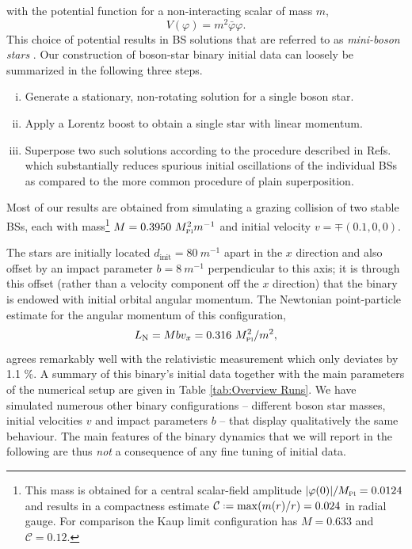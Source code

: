 \documentclass[aps,twocolumn,nofootinbib,superscriptaddress,amsfonts,floatfix
]{revtex4-1} %
\newcommand{\mpl}{M_{\mbox{\tiny Pl}}}
\newcommand*{\defeq}{\mathrel{\vcenter{\baselineskip0.5ex \lineskiplimit0pt
                     \hbox{\scriptsize.}\hbox{\scriptsize.}}}%
                     =}
\begin{document}
with the potential function for a non-interacting scalar
of mass $m$,
\begin{equation}
    V(\varphi) = m^2 \bar{\varphi} \varphi.
\end{equation}
This choice of potential results in BS solutions that are referred to as {\it mini-boson stars}
\cite{ Kaup:1968zz,Gleiser:1988rq,Jetzer:1988vr}. 
Our construction of boson-star binary initial data can loosely
be summarized in the following three steps.
\begin{enumerate}[(i)]
    \item Generate a stationary, non-rotating solution for a single boson star.
    \item Apply a Lorentz boost to obtain a single star with linear momentum.
    \item Superpose two such solutions
    according to the procedure described in
    Refs.~\cite{Helfer:2018vtq,Helfer:2021brt} which
    substantially reduces spurious initial oscillations of the
    individual BSs as compared to the more common procedure
    of plain superposition.
\end{enumerate}

Most of our results are obtained from
simulating a grazing collision of two stable BSs, each with mass\footnote{This mass is obtained for a central scalar-field amplitude $|\varphi(0)|/\mpl =0.0124$ and results in a compactness estimate
$\mathcal{C} \defeq \max (m(r)/r) = 0.024$ in radial gauge.
For comparison the Kaup limit configuration has
$M=0.633$ and $\mathcal{C} = 0.12$.}  $M = 0.3950
~\mpl^2 m^{-1}$ and
initial velocity $v = \mp(0.1,0,0)$.



%
The stars are initially located $d_{\text{init}} = 80~m^{-1}$
apart in the $x$ direction and also offset by an impact parameter
$b=8~m^{-1}$ perpendicular to this axis; it is through this offset
(rather than a velocity component off the $x$ direction) that
the binary is endowed with initial orbital angular momentum.
The Newtonian point-particle estimate for the angular momentum
of this configuration,
%
\begin{equation}
    L_{ \rm N} =  M b v_x = 0.316~\mpl^2/m^2,
\end{equation}
%
agrees remarkably well with the relativistic measurement which only deviates by 1.1 \%.
A summary of this binary's initial data together with the main parameters of the numerical setup are given in Table \ref{tab:Overview Runs}. We have simulated numerous other
binary configurations -- different boson star masses, initial velocities $v$ and impact parameters $b$ -- that display qualitatively
the same behaviour. The main features of the binary dynamics
that we will report in the following are thus {\it not} a
consequence of any fine tuning of initial data.
\end{document}

